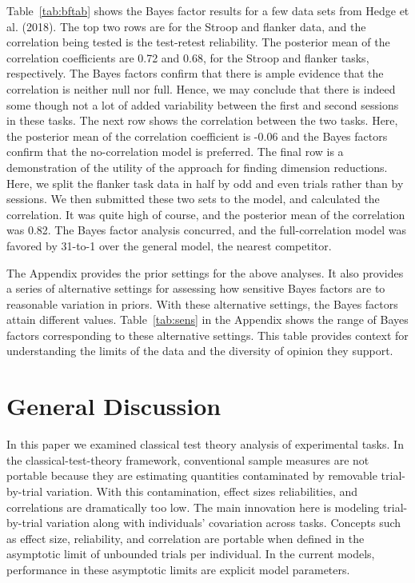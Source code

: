 \documentclass[english,man]{apa6}
\theoremstyle{definition}
\theoremstyle{definition}
\theoremstyle{remark}
\begin{document}
Table~\ref{tab:bftab} shows the Bayes factor results for a few data sets
from Hedge et al. (2018). The top two rows are for the Stroop and
flanker data, and the correlation being tested is the test-retest
reliability. The posterior mean of the correlation coefficients are 0.72
and 0.68, for the Stroop and flanker tasks, respectively. The Bayes
factors confirm that there is ample evidence that the correlation is
neither null nor full. Hence, we may conclude that there is indeed some
though not a lot of added variability between the first and second
sessions in these tasks. The next row shows the correlation between the
two tasks. Here, the posterior mean of the correlation coefficient is
-0.06 and the Bayes factors confirm that the no-correlation model is
preferred. The final row is a demonstration of the utility of the
approach for finding dimension reductions. Here, we split the flanker
task data in half by odd and even trials rather than by sessions. We
then submitted these two sets to the model, and calculated the
correlation. It was quite high of course, and the posterior mean of the
correlation was 0.82. The Bayes factor analysis concurred, and the
full-correlation model was favored by 31-to-1 over the general model,
the nearest competitor.

The Appendix provides the prior settings for the above analyses. It also
provides a series of alternative settings for assessing how sensitive
Bayes factors are to reasonable variation in priors. With these
alternative settings, the Bayes factors attain different values.
Table~\ref{tab:sens} in the Appendix shows the range of Bayes factors
corresponding to these alternative settings. This table provides context
for understanding the limits of the data and the diversity of opinion
they support.

\section{General Discussion}\label{general-discussion}

In this paper we examined classical test theory analysis of experimental
tasks. In the classical-test-theory framework, conventional sample
measures are not portable because they are estimating quantities
contaminated by removable trial-by-trial variation. With this
contamination, effect sizes reliabilities, and correlations are
dramatically too low. The main innovation here is modeling
trial-by-trial variation along with individuals' covariation across
tasks. Concepts such as effect size, reliability, and correlation are
portable when defined in the asymptotic limit of unbounded trials per
individual. In the current models, performance in these asymptotic
limits are explicit model parameters.
\end{document}
